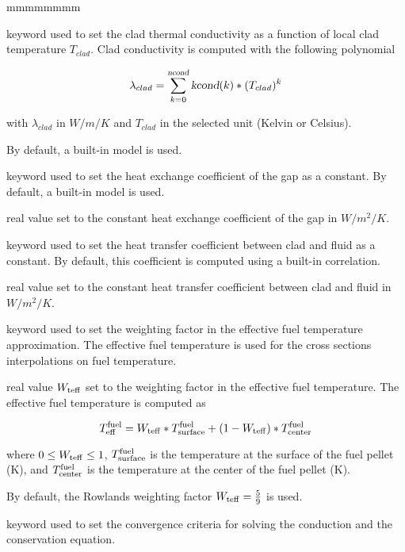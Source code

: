 \begin{ListeDeDescription}{mmmmmmmm}
\item[\moc{CONDC}] keyword used to set the clad thermal conductivity as a function of local clad temperature $T_{clad}$.
Clad conductivity is computed with the following polynomial

$$\lambda_{clad} = \sum_{k=0}^{\dusa{ncond}} {\dusa{kcond}(k)*(T_{clad})^k}$$

with $\lambda_{clad}$ in $W/m/K$ and $T_{clad}$ in the selected unit (Kelvin or Celsius).

By default, a built-in model is used.

\item[\moc{HGAP}] keyword used to set the heat exchange coefficient of the gap as a constant.
By default, a built-in model is used.

\item[\dusa{hgap}] real value set to the constant heat exchange coefficient of the gap in $W/m^2/K$.

\item[\moc{HCONV}] keyword used to set the heat transfer coefficient between clad and fluid as a constant.
By default, this coefficient is computed using a built-in correlation.

\item[\dusa{hconv}] real value set to the constant heat transfer coefficient between clad and fluid in $W/m^2/K$.

\item[\moc{TEFF}] keyword used to set the weighting factor in the effective fuel temperature approximation.
The effective fuel temperature is used for the cross sections interpolations on fuel temperature.

\item[\dusa{wteff}] real value $W_{\rm teff}$ set to the weighting factor in the effective fuel temperature.
The effective fuel temperature is computed as

$$
T^{\rm fuel}_{\rm eff}=W_{\rm teff}*T^{\rm fuel}_{\rm surface}+(1-W_{\rm teff})*T^{\rm fuel}_{\rm center}
$$

where $0\le W_{\rm teff} \le 1$, $T^{\rm fuel}_{\rm surface}$ is the temperature at the surface of the fuel pellet (K), and $T^{\rm fuel}_{\rm center}$ is the temperature at the center of the fuel pellet (K).

By default, the Rowlands weighting factor $W_{\rm teff}={5 \over 9}$ is used\cite{Rowlands}.

\item[\moc{CONV}] keyword used to set the convergence criteria for solving the conduction and the conservation equation.


\end{ListeDeDescription}
